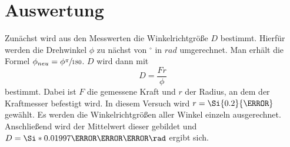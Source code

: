 \section{Auswertung}
\label{sec:Auswertung}

Zunächst wird aus den Messwerten die Winkelrichtgröße $D$ bestimmt.
Hierfür werden die Drehwinkel $\phi$ zu nächst von $^\circ$ in $rad$ umgerechnet.
Man erhält die Formel $\phi_{neu} = \phi \sfrac{\pi}{180}$.
$D$ wird dann mit
\begin{equation}
  D = \frac{F r}{\phi}
\end{equation}
bestimmt.
Dabei ist $F$ die gemessene Kraft und $r$ der Radius, an dem der Kraftmesser befestigt wird.
In diesem Versuch wird $r = \Si{0.2}{\meter}$ gewählt.
Es werden die Winkelrichtgrößen aller Winkel einzeln ausgerechnet.
Anschließend wird der Mittelwert dieser gebildet und $D = \Si*{0.01997}{\N \meter \per\rad}$ ergibt sich.
